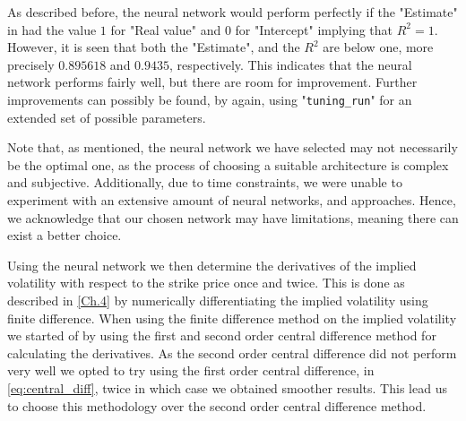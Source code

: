 As described before, the neural network would perform perfectly if the "Estimate" in had the value $1$ for "Real value" and $0$ for "Intercept" implying that $R^2=1$. However, it is seen that both the "Estimate", and the $R^2$ are below one, more precisely $0.895618$ and $0.9435$, respectively. This indicates that the neural network performs fairly well, but there are room for improvement. Further improvements can possibly be found, by again, using "\lstinline{tuning_run}" for an extended set of possible parameters.

Note that, as mentioned, the neural network we have selected may not necessarily be the optimal one, as the process of choosing a suitable architecture is complex and subjective. Additionally, due to time constraints, we were unable to experiment with an extensive amount of neural networks, and approaches. Hence, we acknowledge that our chosen network may have limitations, meaning there can exist a better choice.

Using the neural network we then determine the derivatives of the implied volatility with respect to the strike price once and twice. This is done as described in \autoref{Ch.4} by numerically differentiating the implied volatility using finite difference. When using the finite difference method on the implied volatility we started of by using the first and second order central difference method for calculating the derivatives. As the second order central difference did not perform very well we opted to try using the first order central difference, in \eqref{eq:central_diff}, twice in which case we obtained smoother results. This lead us to choose this methodology over the second order central difference method. 




